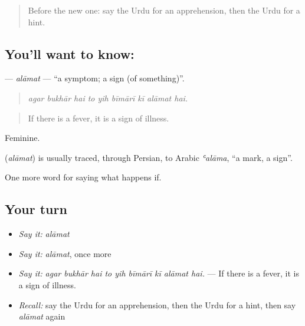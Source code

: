 \label{lesson:UR-C363-alamat}



\begin{quote}
Before the new one: say the Urdu for an apprehension, then the Urdu for a hint.
\end{quote}

\subsection*{You'll want to know: }
\textbf{} — \emph{alāmat} — \textquotedblleft{}a symptom; a sign (of something)\textquotedblright{}.

\begin{quote}
        
\end{quote}

\begin{quote}
\emph{agar bukhār hai to yih bīmārī kī alāmat hai.}
\end{quote}

\begin{quote}
If there is a fever, it is a sign of illness.
\end{quote}

Feminine.

\begin{cousinweb}
\textbf{} (\emph{alāmat}) is usually traced, through Persian, to Arabic \emph{ʿalāma}, \textquotedblleft{}a mark, a sign\textquotedblright{}.
\end{cousinweb}

\begin{grammarlens}[title={What you've built}]
One more word for saying what happens if.
\end{grammarlens}

\subsection*{Your turn}
\begin{itemize}
\raggedright
  \item \emph{Say it:} \emph{alāmat}
  \item \emph{Say it:} \emph{alāmat}, once more
  \item \emph{Say it:} \emph{agar bukhār hai to yih bīmārī kī alāmat hai.} — If there is a fever, it is a sign of illness.
  \item \emph{Recall:} say the Urdu for an apprehension, then the Urdu for a hint, then say \emph{alāmat} again
\end{itemize}

